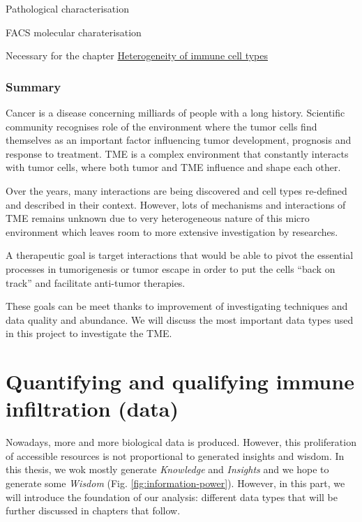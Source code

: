 \documentclass[12pt,]{book}
\theoremstyle{definition}
\theoremstyle{definition}
\theoremstyle{definition}
\theoremstyle{remark}
\begin{document}
Pathological characterisation

FACS molecular charaterisation

Necessary for the chapter \protect\hyperlink{map}{Heterogeneity of
immune cell types}

\hypertarget{summary}{%
\subsubsection{Summary}\label{summary}}

Cancer is a disease concerning milliards of people with a long history.
Scientific community recognises role of the environment where the tumor
cells find themselves as an important factor influencing tumor
development, prognosis and response to treatment. TME is a complex
environment that constantly interacts with tumor cells, where both tumor
and TME influence and shape each other.

Over the years, many interactions are being discovered and cell types
re-defined and described in their context. However, lots of mechanisms
and interactions of TME remains unknown due to very heterogeneous nature
of this micro environment which leaves room to more extensive
investigation by researches.

A therapeutic goal is target interactions that would be able to pivot
the essential processes in tumorigenesis or tumor escape in order to put
the cells ``back on track'' and facilitate anti-tumor therapies.

These goals can be meet thanks to improvement of investigating
techniques and data quality and abundance. We will discuss the most
important data types used in this project to investigate the TME.

\hypertarget{quantifying-and-qualifying-immune-infiltration-data}{%
\section{Quantifying and qualifying immune infiltration
(data)}\label{quantifying-and-qualifying-immune-infiltration-data}}

Nowadays, more and more biological data is produced. However, this
proliferation of accessible resources is not proportional to generated
insights and wisdom. In this thesis, we wok mostly generate
\emph{Knowledge} and \emph{Insights} and we hope to generate some
\emph{Wisdom} (Fig. \ref{fig:information-power}). However, in this part,
we will introduce the foundation of our analysis: different data types
that will be further discussed in chapters that follow.
\end{document}

